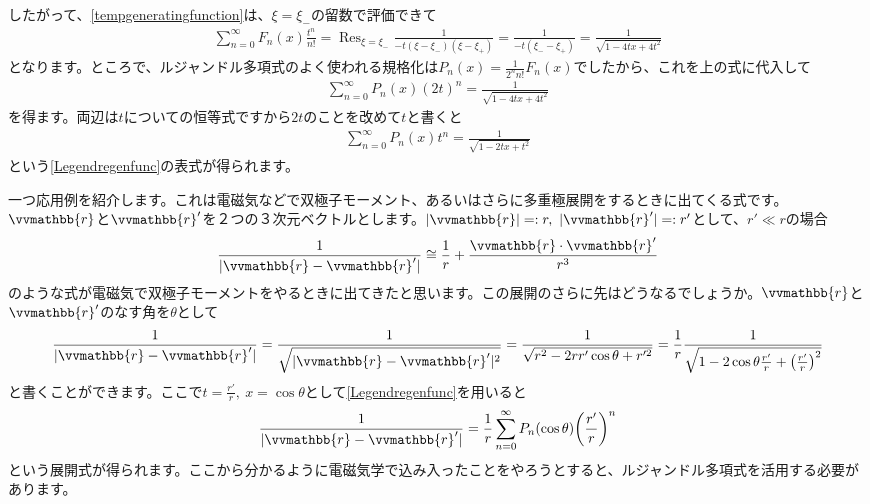 \documentclass[report,paper=a4, fontsize=12pt, line_length=16cm, number_of_lines=33,dvipdfmx]{jlreq}
\numberwithin{equation}{section}
\newcommand{\rb}{\vvmathbb{r}}
\DeclareMathOperator*{\Resi}{\mathrm{Res}}
\begin{document}
したがって、\eqref{tempgeneratingfunction}は、$\xi=\xi_{-}$の留数で評価できて
\begin{align}
  \sum_{n=0}^{\infty}F_n(x)\frac{t^n}{n!}
  =\Resi_{\xi=\xi_{-}}\frac{1}{-t(\xi-\xi_{-})(\xi-\xi_{+})}
  =\frac{1}{-t(\xi_{-}-\xi_{+})}
  =\frac{1}{\sqrt{1-4tx+4t^2}}
\end{align}
となります。ところで、ルジャンドル多項式のよく使われる規格化は$P_n(x)=\frac{1}{2^n n!}F_{n}(x)$でしたから、これを上の式に代入して
\begin{align}
  \sum_{n=0}^{\infty}P_n(x)(2t)^n=\frac{1}{\sqrt{1-4tx+4t^2}}
\end{align}
を得ます。両辺は$t$についての恒等式ですから$2t$のことを改めて$t$と書くと
\begin{align}
  \sum_{n=0}^{\infty}P_n(x)t^n=\frac{1}{\sqrt{1-2tx+t^2}}  
\end{align}
という\eqref{Legendregenfunc}の表式が得られます。

一つ応用例を紹介します。これは電磁気などで双極子モーメント、あるいはさらに多重極展開をするときに出てくる式です。$\rb$と$\rb'$を２つの３次元ベクトルとします。$|\rb|=:r,\ |\rb'|=:r'$として、$r'\ll r$の場合
\begin{align}
  \frac{1}{|\rb-\rb'|}\cong \frac{1}{r}+\frac{\rb\cdot\rb'}{r^3}
\end{align}
のような式が電磁気で双極子モーメントをやるときに出てきたと思います。この展開のさらに先はどうなるでしょうか。$\rb$と$\rb'$のなす角を$\theta$として
\begin{align}
  \frac{1}{|\rb-\rb'|}
  =\frac{1}{\sqrt{|\rb-\rb'|^2}}
  =\frac{1}{\sqrt{r^2-2rr'\cos\theta+r'^2}}
  =\frac{1}{r}\frac{1}{\sqrt{1-2\cos\theta\frac{r'}{r}+\qty(\frac{r'}{r})^2}}
\end{align}
と書くことができます。ここで$t=\frac{r'}{r},\ x=\cos\theta$として\eqref{Legendregenfunc}を用いると
\begin{align}
  \frac{1}{|\rb-\rb'|}=\frac{1}{r}\sum_{n=0}^{\infty}
  P_n(\cos\theta)\qty(\frac{r'}{r})^n
\end{align}
という展開式が得られます。ここから分かるように電磁気学で込み入ったことをやろうとすると、ルジャンドル多項式を活用する必要があります。
\end{document}
